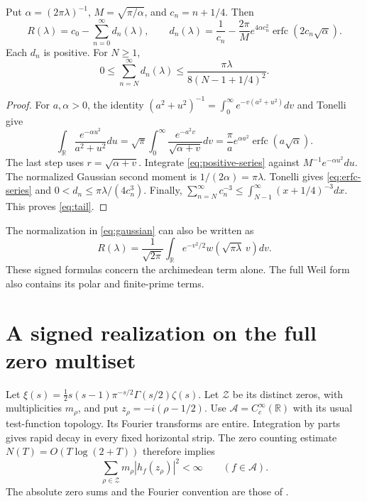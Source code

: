 \documentclass[11pt]{article}
\begin{document}
\begin{proposition}\label{prop:erfc}
Put $\alpha=(2\pi\lambda)^{-1}$, $M=\sqrt{\pi/\alpha}$, and $c_n=n+1/4$.
Then
\begin{equation}\label{eq:erfc-series}
 R(\lambda)=c_0-\sum_{n=0}^\infty d_n(\lambda),\qquad
 d_n(\lambda)=\frac1{c_n}-\frac{2\pi}{M}
                  e^{4\alpha c_n^2}\operatorname{erfc}(2c_n\sqrt\alpha).
\end{equation}
Each $d_n$ is positive. For $N\ge1$,
\begin{equation}\label{eq:tail}
 0\le\sum_{n=N}^\infty d_n(\lambda)
    \le\frac{\pi\lambda}{8(N-1+1/4)^2}.
\end{equation}
\end{proposition}
\begin{proof}
For $a,\alpha>0$, the identity
$(a^2+u^2)^{-1}=\int_0^\infty e^{-v(a^2+u^2)}dv$ and Tonelli give
\[
 \int_{\mathbb R}\frac{e^{-\alpha u^2}}{a^2+u^2}du
 =\sqrt\pi\int_0^\infty\frac{e^{-a^2v}}{\sqrt{\alpha+v}}dv
 =\frac\pi a e^{\alpha a^2}\operatorname{erfc}(a\sqrt\alpha).
\]
The last step uses $r=\sqrt{\alpha+v}$.
Integrate \eqref{eq:positive-series} against $M^{-1}e^{-\alpha u^2}du$.
The normalized Gaussian second moment is $1/(2\alpha)=\pi\lambda$.
Tonelli gives \eqref{eq:erfc-series} and
$0<d_n\le\pi\lambda/(4c_n^3)$.
Finally,
$\sum_{n=N}^\infty c_n^{-3}\le\int_{N-1}^\infty(x+1/4)^{-3}dx$.
This proves \eqref{eq:tail}.
\end{proof}

The normalization in \eqref{eq:gaussian} can also be written as
\[
 R(\lambda)=\frac1{\sqrt{2\pi}}
          \int_{\mathbb R}e^{-v^2/2}w(\sqrt{\pi\lambda}\,v)dv.
\]
These signed formulas concern the archimedean term alone.
The full Weil form also contains its polar and finite-prime terms.

\section{A signed realization on the full zero multiset}

Let $\xi(s)=\tfrac12s(s-1)\pi^{-s/2}\Gamma(s/2)\zeta(s)$.
Let $\mathcal Z$ be its distinct zeros, with multiplicities $m_\rho$,
and put $z_\rho=-i(\rho-1/2)$.
Use $\mathscr A=C_c^\infty(\mathbb R)$ with its usual test-function topology.
Its Fourier transforms are entire.
Integration by parts gives rapid decay in every fixed horizontal strip.
The zero counting estimate $N(T)=O(T\log(2+T))$ therefore implies
\[
 \sum_{\rho\in\mathcal Z}m_\rho|h_f(z_\rho)|^2<\infty
 \qquad(f\in\mathscr A).
\]
The absolute zero sums and the Fourier convention are those of
\cite[Eqs.~(1.1)--(1.2)]{suzuki}.
\end{document}
